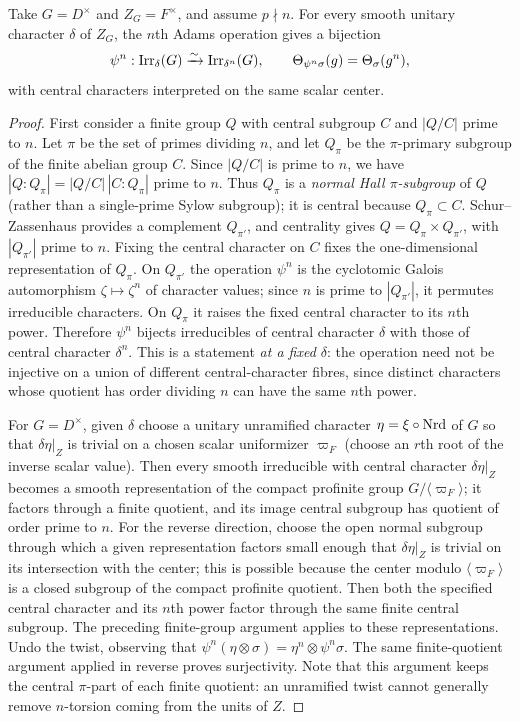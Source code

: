 \begin{lemma}\label{III:lem:tame-adams}
Take $G=D^\times$ and $Z_G=F^\times$, and assume $p\nmid n$.
For every smooth unitary character $\delta$ of $Z_G$, the
$n$th Adams operation gives a bijection
\[
\psi^n:\operatorname{Irr}_\delta(G)\xrightarrow{\sim}
\operatorname{Irr}_{\delta^n}(G),\qquad
\Theta_{\psi^n\sigma}(g)=\Theta_\sigma(g^n),
\]
with central characters interpreted on the same scalar center.
\end{lemma}
\begin{proof}
First consider a finite group $Q$ with central subgroup $C$
and $|Q/C|$ prime to $n$. Let $\pi$ be the set of primes dividing $n$, and let $Q_\pi$
be the $\pi$-primary subgroup of the finite abelian group $C$.
Since $|Q/C|$ is prime to $n$, we have
$|Q:Q_\pi|=|Q/C|\,|C:Q_\pi|$ prime to $n$.
Thus $Q_\pi$ is a \emph{normal Hall $\pi$-subgroup} of $Q$
(rather than a single-prime Sylow subgroup);
it is central because $Q_\pi\subset C$. Schur--Zassenhaus
provides a complement $Q_{\pi'}$, and centrality gives
$Q=Q_\pi\times Q_{\pi'}$, with $|Q_{\pi'}|$ prime to $n$.
Fixing the central character on $C$ fixes the one-dimensional
representation of $Q_\pi$.
On $Q_{\pi'}$ the operation $\psi^n$ is the cyclotomic Galois
automorphism $\zeta\mapsto\zeta^n$ of character values; since
$n$ is prime to $|Q_{\pi'}|$, it permutes irreducible characters.
On $Q_\pi$ it raises the fixed central character to its $n$th
power. Therefore $\psi^n$ bijects irreducibles of central
character $\delta$ with those of central character $\delta^n$.
This is a statement \emph{at a fixed $\delta$}: the operation
need not be injective on a union of different central-character
fibres, since distinct characters whose quotient has order dividing
$n$ can have the same $n$th power.

For $G=D^\times$, given $\delta$ choose a unitary unramified
character $\eta=\xi\circ\operatorname{Nrd}$ of $G$ so that
$\delta\eta|_Z$ is trivial on a chosen scalar uniformizer
$\varpi_F$ (choose an $r$th root of the inverse scalar value).
Then every smooth irreducible with central character $\delta\eta|_Z$
becomes a smooth representation of the compact profinite group
$G/\langle\varpi_F\rangle$; it factors through a finite quotient,
and its image central subgroup has quotient of order prime to
$n$. For the reverse direction, choose the open normal subgroup
through which a given representation factors small enough that
$\delta\eta|_Z$ is trivial on its intersection with the center;
this is possible because the center modulo $\langle\varpi_F\rangle$
is a closed subgroup of the compact profinite quotient.
Then both the specified central character and its $n$th power
factor through the same finite central subgroup. The preceding
finite-group argument applies to these representations.
Undo the twist, observing that
$\psi^n(\eta\otimes\sigma)=\eta^n\otimes\psi^n\sigma$.
The same finite-quotient argument applied in reverse proves
surjectivity. Note that this argument keeps the central
$\pi$-part of each finite quotient: an unramified twist cannot
generally remove $n$-torsion coming from the units of $Z$.
\end{proof}

